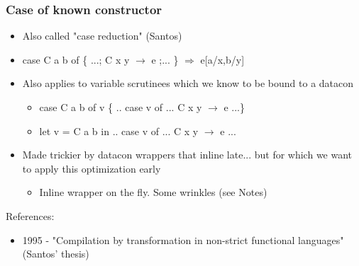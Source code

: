 \documentclass[aspectratio=169]{beamer}
\begin{document}
\begin{frame}
  \frametitle{Case of known constructor}
  \begin{itemize}
    \item Also called "case reduction" (Santos)
    \item case C a b of \{ ...; C x y $\rightarrow$ e ;... \} $\Longrightarrow$ e[a/x,b/y]
    \item Also applies to variable scrutinees which we know to be bound to a
      datacon
      \begin{itemize}
        \item case C a b of v \{ .. case v of ... C x y $\rightarrow$ e ...\}
        \item let v = C a b in .. case v of ... C x y $\rightarrow$ e ...
      \end{itemize}
    \item Made trickier by datacon wrappers that inline late... but for which we
      want to apply this optimization early
      \begin{itemize}
        \item Inline wrapper on the fly. Some wrinkles (see Notes)
      \end{itemize}
  \end{itemize}

  References:
  \begin{itemize}
    \item 1995 - "Compilation by transformation in non-strict functional
      languages" (Santos' thesis)
  \end{itemize}
\end{frame}
\end{document}
